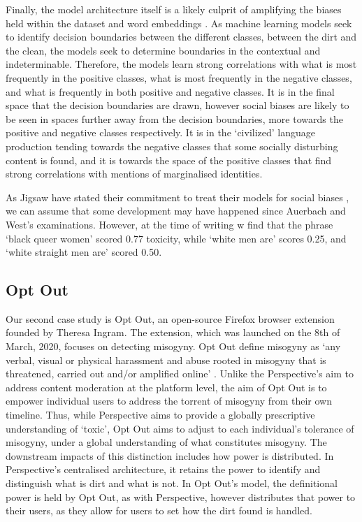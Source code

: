 Finally, the model architecture itself is a likely culprit of amplifying the biases held within the dataset and word embeddings \cite{Zhao:2017}. As machine learning models seek to identify decision boundaries between the different classes, between the dirt and the clean, the models seek to determine boundaries in the contextual and indeterminable. Therefore, the models learn strong correlations with what is most frequently in the positive classes, what is most frequently in the negative classes, and what is frequently in both positive and negative classes. It is in the final space that the decision boundaries are drawn, however social biases are likely to be seen in spaces further away from the decision boundaries, more towards the positive and negative classes respectively. It is in the `civilized' language production tending towards the negative classes that some socially disturbing content is found, and it is towards the space of the positive classes that find strong correlations with mentions of marginalised identities.\vspace{5mm}

As Jigsaw have stated their commitment to treat their models for social biases \cite{Marvin:2019}, we can assume that some development may have happened since Auerbach and West's examinations. However, at the time of writing w find that the phrase ‘black queer women’ scored 0.77 toxicity, while ‘white men are’ scores 0.25, and ‘white straight men are’ scored 0.50.

\subsection{Opt Out}
Our second case study is Opt Out, an open-source Firefox browser extension founded by Theresa Ingram. The extension, which was launched on the 8th of March, 2020, focuses on detecting misogyny. Opt Out define misogyny as `any verbal, visual or physical harassment and abuse rooted in misogyny that is threatened, carried out and/or amplified online' \cite{Ingram:2020}. Unlike the Perspective's aim to address content moderation at the platform level, the aim of Opt Out is to empower individual users to address the torrent of misogyny from their own timeline. Thus, while Perspective aims to provide a globally prescriptive understanding of `toxic', Opt Out aims to adjust to each individual's tolerance of misogyny, under a global understanding of what constitutes misogyny. The downstream impacts of this distinction includes how power is distributed. In Perspective's centralised architecture, it retains the power to identify and distinguish what is dirt and what is not. In Opt Out's model, the definitional power is held by Opt Out, as with Perspective, however distributes that power to their users, as they allow for users to set how the dirt found is handled.


